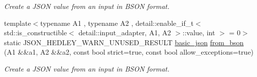 \begin{DoxyCompactItemize}
\begin{DoxyCompactList}\small\item\em Create a J\+S\+ON value from an input in B\+S\+ON format. \end{DoxyCompactList}\item 
{\footnotesize template$<$typename A1 , typename A2 , detail\+::enable\+\_\+if\+\_\+t$<$ std\+::is\+\_\+constructible$<$ detail\+::input\+\_\+adapter, A1, A2 $>$\+::value, int $>$  = 0$>$ }\\static J\+S\+O\+N\+\_\+\+H\+E\+D\+L\+E\+Y\+\_\+\+W\+A\+R\+N\+\_\+\+U\+N\+U\+S\+E\+D\+\_\+\+R\+E\+S\+U\+LT \hyperlink{classnlohmann_1_1basic__json}{basic\+\_\+json} \hyperlink{classnlohmann_1_1basic__json_a000cef9f49c8f04319cf98150361d13d}{from\+\_\+bson} (A1 \&\&a1, A2 \&\&a2, const bool strict=true, const bool allow\+\_\+exceptions=true)
\begin{DoxyCompactList}\small\item\em Create a J\+S\+ON value from an input in B\+S\+ON format. \end{DoxyCompactList}\end{DoxyCompactItemize}
